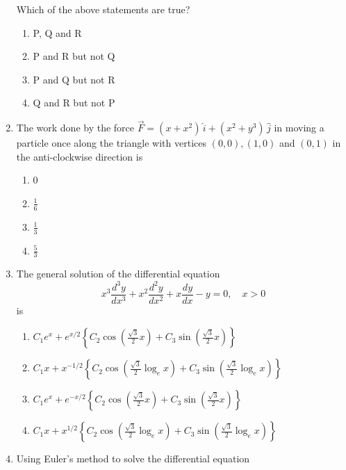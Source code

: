 \documentclass[journal]{IEEEtran}
\numberwithin{equation}{enumi}
\numberwithin{figure}{enumi}
\begin{document}
\begin{enumerate}
    Which of the above statements are true?
    \begin{multicols}{2}
    \begin{enumerate}
        \item P, Q and R
        \item P and R but not Q
        \item P and Q but not R
        \item Q and R but not P
    \end{enumerate}
    \end{multicols}
\bigskip
    \item The work done by the force \( \vec{F} = (x + x^2) \, \hat{i} + (x^2 + y^3) \, \hat{j} \) in moving a particle once along the triangle with vertices \( (0,0), (1,0) \) and \( (0,1) \) in the anti-clockwise direction is
    \begin{multicols}{4}
    \begin{enumerate}
        \item 0
        \item \( \frac{1}{6} \)
        \item \( \frac{1}{3} \)
        \item \( \frac{5}{3} \)
    \end{enumerate}
    \end{multicols} 
\bigskip   
    \item The general solution of the differential equation
    \[
    x^3 \frac{d^3 y}{dx^3} + x^2 \frac{d^2 y}{dx^2} + x \frac{dy}{dx} - y = 0, \quad x > 0
    \]
    is
    \begin{enumerate}
        \item \( C_1 e^x + e^{x/2} \left\{ C_2 \cos\left( \frac{\sqrt{3}}{2} x \right) + C_3 \sin\left( \frac{\sqrt{3}}{2} x \right) \right\} \)
        \item \( C_1 x + x^{-1/2} \left\{ C_2 \cos\left( \frac{\sqrt{3}}{2} \log_e x \right) + C_3 \sin\left( \frac{\sqrt{3}}{2} \log_e x \right) \right\} \)
        \item \( C_1 e^x + e^{-x/2} \left\{ C_2 \cos\left( \frac{\sqrt{3}}{2} x \right) + C_3 \sin\left( \frac{\sqrt{3}}{2} x \right) \right\} \)
        \item \( C_1 x + x^{1/2} \left\{ C_2 \cos\left( \frac{\sqrt{3}}{2} \log_e x \right) + C_3 \sin\left( \frac{\sqrt{3}}{2} \log_e x \right) \right\} \)
    \end{enumerate}
\bigskip
    \item Using Euler's method to solve the differential equation
    \[
\]
\end{enumerate}
\end{document}
